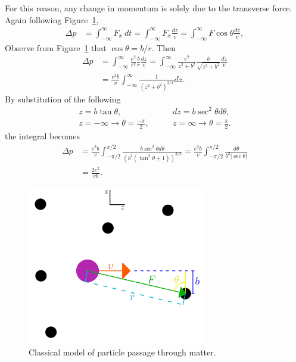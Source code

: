 For this reason, any change in momentum is solely due to the transverse force. Again following Figure~\ref{fig:bethe_bloch},
\begin{align*}
\Delta p &=\int_{-\infty} ^\infty F_x \ dt = \int_{-\infty} ^{\infty} F_x \frac{dz}{v} = \int_{-\infty} ^{\infty} F\cos{\theta}\frac{dz}{v},
\end{align*}
 Observe from Figure~\ref{fig:bethe_bloch} that $\cos\theta = b/r$. Then
\begin{align*}
\Delta p &= \int_{-\infty} ^{\infty} \frac{e^2}{r^2} \frac{b}{r} \frac{dz}{v} = \int_{-\infty} ^{\infty} \frac{e^2}{z^2+b^2} \frac{b}{\sqrt{z^2+b^2}} \frac{dz}{v}\\
&= \frac{e^2 b}{v} \int_{-\infty} ^{\infty} \frac{1}{(z^2+b^2)^{3/2}}dz.
\end{align*}
By substitution of the following
\begin{align*}
z = b\tan{\theta},&\qquad dz = b\sec^2{\theta} d\theta,\\
z=-\infty\rightarrow \theta = \frac{-\pi}{2},&\qquad z=\infty \rightarrow \theta = \frac{\pi}{2}.
\end{align*}
the integral becomes
\begin{align*}
\Delta p &=\frac{e^2 b}{v}\int_{-\pi/2} ^{\pi/2} \frac{b\sec^2{\theta} d\theta}{(b^2(\tan^2{\theta}+1))^{3/2}} =\frac{e^2 b}{v}\int_{-\pi/2} ^{\pi/2} \frac{d\theta}{b^2 |\sec{\theta}|}\\
&=\frac{2e^2}{vb}.
\end{align*}

\begin{figure}[h!]
  \centering
    \includegraphics[width=0.7\textwidth]{Figures/bethe_bloch} 
  \caption{Classical model of particle passage through matter.}
  \label{fig:bethe_bloch}
\end{figure}


